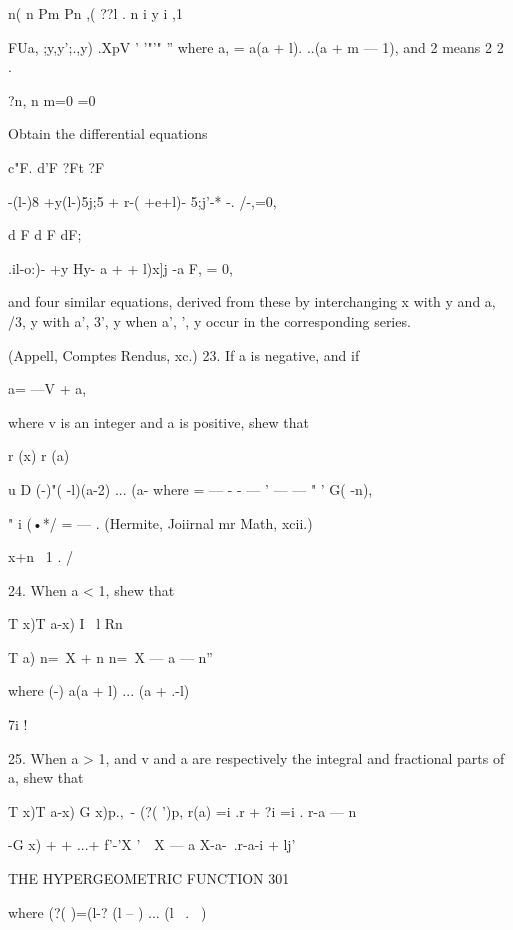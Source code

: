  n( n Pm Pn 
,( ??l . n i y i   ,1 



FUa, ;y,y';.,y)  .XpV ' '"'" '' 
where a,  = a(a + l). ..(a + m — 1), and 2 means 2 2 . 

?n, n m=0  =0 

Obtain the differential equations 

c"F. d'F  ?Ft ?F  

-(l-)8 +y(l-)5j;5 + r-( +e+l)- 5;j'-* -. /-,=0, 

d F  d F  dF; 

.il-o:)- +y  Hy- a +   + l)x]j -a F, = 0, 

and four similar equations, derived from these by interchanging x with y and a, /3, y with 
a',  3', y when a',  ', y occur in the corresponding series. 

(Appell, Comptes Rendus, xc.) 
23. If a is negative, and if 

a= —V + a, 

where v is an integer and a is positive, shew that 



r (x) r (a) 






u D (-)"( -l)(a-2) ... (a-%
where    =   —  - - — ' — —   "  ' G( -n), 



" i (•*/ = —    . (Hermite, Joiirnal mr Math, xcii.) 

x+n \ 1 . / 



24. When a < 1, shew that 



T x)T a-x)  I   \ l Rn 



T  a) n=\ X + n n=\ X — a — n'' 

where (-) a(a + l) ... (a + .-l)   

7i ! 

25. When a > 1, and v and a are respectively the integral and fractional parts of 
a, shew that 

T x)T a-x)    G x)p.,\  - (?(  ')p,   
r(a)  =i .r + ?i  =i . r-a — n 

-G x)  +   + ...+ f'-'X 
  '\ \  X — a X-a-\ .r-a-i  + lj' 



THE HYPERGEOMETRIC FUNCTION 301 



where (?( )=(l-?  (l --  ) ... (l \  . \  ) 

